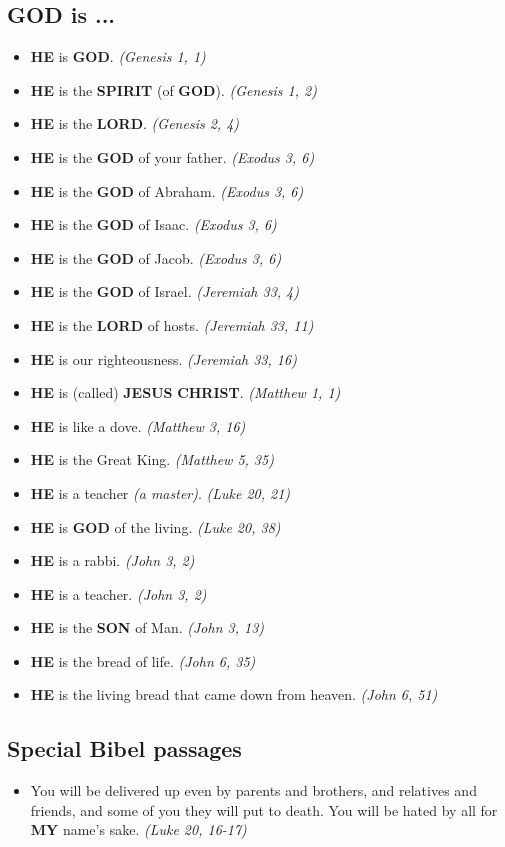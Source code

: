\documentclass[12pt,a5paper]{article}
\newcommand{\Christ}[0]{\textbf{CHRIST}}
\newcommand{\God}[0]{\textbf{GOD}}
\newcommand{\He}[0]{\textbf{HE}}
\newcommand{\Jesus}[0]{\textbf{JESUS}}
\newcommand{\Lord}[0]{\textbf{LORD}}
\newcommand{\My}[0]{\textbf{MY}}
\newcommand{\Son}[0]{\textbf{SON}}
\newcommand{\Spirit}[0]{\textbf{SPIRIT}}
\begin{document}
	\newpage
	\subsection{{\God} is ...}
		\begin{itemize}[nosep]
			\item {\He} is {\God}. \textit{(Genesis 1, 1)}
			\item {\He} is the {\Spirit} (of {\God}). \textit{(Genesis 1, 2)}
			\item {\He} is the {\Lord}. \textit{(Genesis 2, 4)}
			\item {\He} is the {\God} of your father. \textit{(Exodus 3, 6)}
			\item {\He} is the {\God} of Abraham. \textit{(Exodus 3, 6)}
			\item {\He} is the {\God} of Isaac. \textit{(Exodus 3, 6)}
			\item {\He} is the {\God} of Jacob. \textit{(Exodus 3, 6)}
			\item {\He} is the {\God} of Israel. \textit{(Jeremiah 33, 4)}
			\item {\He} is the {\Lord} of hosts. \textit{(Jeremiah 33, 11)}
			\item {\He} is our righteousness. \textit{(Jeremiah 33, 16)}
			\item {\He} is (called) {\Jesus} {\Christ}. \textit{(Matthew 1, 1)}
			\item {\He} is like a dove. \textit{(Matthew 3, 16)}
			\item {\He} is the Great King. \textit{(Matthew 5, 35)}
			\item {\He} is a teacher \textit{(a master)}. \textit{(Luke 20, 21)}
			\item {\He} is {\God} of the living. \textit{(Luke 20, 38)}		
			\item {\He} is a rabbi. \textit{(John 3, 2)}
			\item {\He} is a teacher. \textit{(John 3, 2)}
			\item {\He} is the {\Son} of Man. \textit{(John 3, 13)}
			\item {\He} is the bread of life. \textit{(John 6, 35)}
			\item {\He} is the living bread that came down from heaven. \textit{(John 6, 51)}
		\end{itemize}

	\newpage
	\subsection{Special Bibel passages}
		\begin{itemize}[nosep]
			\item	You will be delivered up even by parents and brothers,
					and relatives and friends,
					and some of you they will put to death.
					You will be hated by all for {\My} name's sake.
					\textit{(Luke 20, 16-17)}
		\end{itemize}
\end{document}
